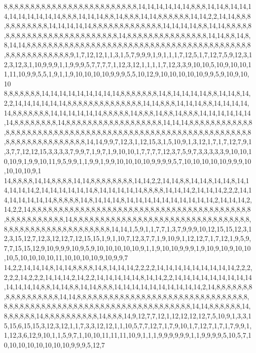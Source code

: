 8,8,8,8,8,8,8,8,8,8,8,8,8,8,8,8,8,8,8,8,8,8,8,8,8,14,14,14,14,14,14,8,8,8,14,14,8,14,14,14,14,14,14,14,14,14,8,8,8,14,14,14,8,8,14,8,8,8,14,14,8,8,8,8,8,8,14,14,2,2,14,14,8,8,8,8,8,8,8,8,8,8,8,14,14,14,14,14,8,8,8,8,8,8,8,8,8,8,8,8,8,14,14,14,14,8,8,14,14,8,8,8,8,8,8,8,8,8,8,8,8,8,8,8,8,8,8,8,8,8,8,8,8,8,8,14,8,8,8,8,8,8,8,8,8,8,8,8,8,8,8,14,14,8,8,14,8,8,14,14,8,8,8,8,8,8,8,8,8,8,8,8,8,8,8,8,8,8,8,8,8,8,8,8,8,8,8,8,8,8,8,8,8,8,8,8,8,8,8,8,8,8,8,8,8,8,8,8,8,8,8,8,8,8,9,1,7,12,12,1,1,3,1,5,7,9,9,9,1,9,1,1,1,7,12,5,1,7,12,7,5,9,12,3,12,3,12,3,1,10,9,9,9,1,1,9,9,9,5,7,7,7,7,1,12,3,12,1,1,1,1,7,12,3,3,9,10,10,5,10,9,10,10,11,11,10,9,9,5,5,1,9,1,1,9,10,10,10,10,9,9,9,5,5,10,12,9,10,10,10,10,10,9,9,5,9,10,9,10,10
8,8,8,8,8,8,8,14,14,14,14,14,14,14,14,14,8,8,8,8,8,8,8,14,8,14,14,14,14,8,8,14,14,8,14,2,2,14,14,14,14,14,14,8,8,8,8,8,8,8,8,8,8,8,8,8,8,14,14,8,8,8,14,14,14,8,8,14,14,14,14,14,8,8,8,8,8,8,8,14,14,14,14,14,14,8,8,8,8,8,14,8,8,8,14,8,8,14,8,8,8,14,14,14,14,14,14,14,8,8,8,8,8,8,8,8,14,8,8,8,8,8,8,8,8,8,8,8,8,8,8,8,8,8,8,14,14,14,8,8,8,8,8,8,8,8,8,8,8,8,8,8,8,8,8,8,8,8,8,8,8,8,8,8,8,8,8,8,8,8,8,8,8,8,8,8,8,8,8,8,8,8,8,8,8,8,8,8,8,8,8,8,8,8,8,8,8,8,8,8,8,8,8,8,8,8,8,8,8,8,8,14,14,9,9,7,12,3,1,12,15,3,1,5,10,9,1,3,12,1,7,1,7,12,7,9,1,3,7,7,12,12,15,3,3,3,3,7,9,9,7,1,9,7,1,9,10,10,1,7,7,7,7,12,3,7,5,9,7,3,3,3,3,3,9,10,10,10,10,9,1,9,9,10,11,9,5,9,9,1,1,9,9,1,9,9,10,10,10,10,9,9,9,9,5,7,10,10,10,10,10,9,9,9,10,10,10,10,9,1
14,8,8,8,8,14,14,8,8,8,8,14,14,8,8,8,8,8,8,8,8,14,14,2,2,14,14,8,8,14,14,8,14,14,8,14,14,14,14,14,2,14,14,14,14,14,14,8,14,14,14,14,14,8,8,8,8,14,14,14,2,14,14,14,2,2,2,14,14,14,14,14,14,14,8,8,8,8,8,14,8,14,14,14,8,14,14,14,14,14,14,14,14,14,14,2,14,14,14,2,14,2,2,14,8,8,8,8,8,8,8,8,8,8,8,8,8,8,8,8,8,8,8,8,8,8,8,8,8,8,8,8,8,8,8,8,8,8,8,8,8,8,8,8,8,8,8,8,8,8,8,8,8,8,8,8,14,8,8,8,8,8,8,8,8,8,8,8,8,8,8,8,8,8,8,8,8,8,8,8,8,8,8,8,8,8,8,8,8,8,8,8,8,8,8,8,8,8,8,8,8,8,8,8,8,8,8,8,8,8,14,14,1,5,9,1,1,7,7,1,3,7,9,9,9,10,12,15,15,12,3,12,3,15,12,7,12,3,12,12,7,12,15,15,1,9,1,10,7,12,3,7,7,1,9,10,9,1,12,12,7,1,7,12,1,9,5,9,7,7,15,15,12,9,10,9,9,9,10,9,5,9,10,10,10,10,10,9,1,1,9,10,10,9,9,9,1,9,10,9,10,9,10,10,10,5,10,10,10,10,11,10,10,10,10,9,10,9,9,7
14,2,2,14,14,14,8,14,14,8,8,8,8,14,8,14,14,14,2,2,2,2,14,14,14,14,14,14,14,14,14,2,2,2,2,2,2,14,2,2,2,14,14,14,2,14,2,2,14,14,14,14,14,8,14,14,2,2,14,14,14,14,14,14,14,14,14,14,14,14,14,8,8,14,14,8,8,14,14,8,8,8,14,14,14,14,14,14,14,14,14,14,2,14,8,8,8,8,8,8,8,8,8,8,8,8,8,8,8,8,8,14,14,8,8,8,8,8,8,8,8,8,8,8,8,8,8,8,8,8,8,8,8,8,8,8,8,8,8,8,8,8,8,8,8,8,8,8,8,8,8,8,8,8,8,8,8,8,8,8,8,8,8,8,8,8,8,8,8,8,8,8,8,8,8,8,8,8,8,8,14,14,8,8,8,8,8,8,14,8,8,8,8,8,8,14,8,8,8,8,8,8,8,8,8,8,14,8,8,8,14,9,12,7,7,12,1,12,12,12,12,7,5,10,9,1,3,3,15,15,6,15,15,3,12,3,12,1,1,7,3,3,12,12,1,1,10,5,7,7,12,7,1,7,9,10,1,7,12,7,1,7,1,7,9,9,1,1,12,3,6,12,9,10,1,1,5,9,7,1,10,10,11,11,11,10,9,1,1,1,9,9,9,9,9,9,1,1,9,9,9,9,5,10,5,7,10,10,10,10,10,10,10,10,9,9,9,5,12,7
